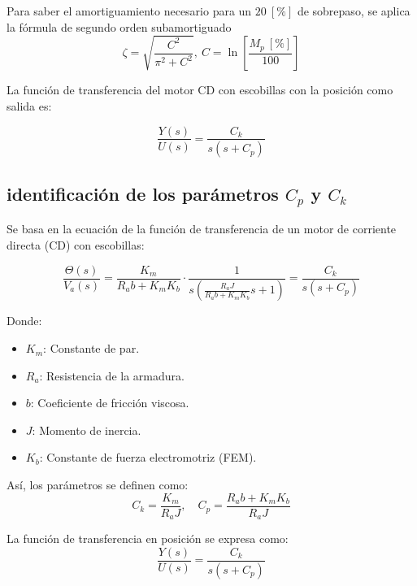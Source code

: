 \documentclass{article}          %
\begin{document}
        Para saber el amortiguamiento necesario para un $20 \ [\%]$ de sobrepaso, se aplica la fórmula de segundo orden subamortiguado
        \begin{equation}
            \zeta = \sqrt{\frac{C^{2}}{\pi^{2}+C^{2}}}, \ C=\ln\left[ \frac{M_p \ [\%]}{100}  \right]
        \end{equation}

        La función de transferencia del motor CD con escobillas con la posición como salida es:

        \begin{equation}
            \frac{Y(s)}{U(s)} = \frac{C_k}{s(s+C_p)}
        \end{equation}

        \subsection{identificación de los parámetros \( C_p \) y \( C_k \)}

        Se basa en la ecuación de la función de transferencia de un motor de corriente directa (CD) con escobillas:

        \begin{equation}
        \frac{\Theta(s)}{V_a(s)} = \frac{K_m}{R_a b + K_m K_b} \cdot \frac{1}{s \left( \frac{R_a J}{R_a b + K_m K_b} s + 1 \right)}
        = \frac{C_k}{s(s + C_p)}
        \end{equation}

        Donde:
        \begin{itemize}
            \item \( K_m \): Constante de par.
            \item \( R_a \): Resistencia de la armadura.
            \item \( b \): Coeficiente de fricción viscosa.
            \item \( J \): Momento de inercia.
            \item \( K_b \): Constante de fuerza electromotriz (FEM).
        \end{itemize}

        Así, los parámetros se definen como:
        \begin{equation}
        C_k = \frac{K_m}{R_a J}, \quad C_p = \frac{R_a b + K_m K_b}{R_a J}
        \end{equation}

        La función de transferencia en posición se expresa como:
        \begin{equation}
        \frac{Y(s)}{U(s)} = \frac{C_k}{s(s+C_p)}
        \end{equation}
\end{document}
